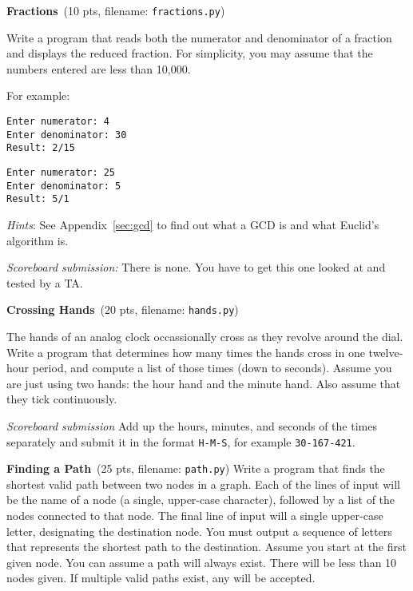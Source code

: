 \documentclass[11pt]{cselabheader}
\newcommand{\cop}[3]{\textbf{#1}~(#2 pts, filename: \texttt{#3})\quad}
\theoremstyle{plain}
\begin{document}
\begin{enumerate}
	\item \cop{Fractions}{10}{fractions.py}
		
		Write a program that reads both the numerator and denominator of
		a fraction and displays the reduced fraction. For simplicity, you
		may assume that the numbers entered are less than 10,000. 
		
		For example:
		\begin{lstlisting}[style=bash]
Enter numerator: 4
Enter denominator: 30
Result: 2/15
		\end{lstlisting}

		\begin{lstlisting}[style=bash]
Enter numerator: 25
Enter denominator: 5
Result: 5/1
		\end{lstlisting}

		\textit{Hints}: See Appendix~\ref{sec:gcd} to find out what a GCD is 
		and what Euclid's algorithm is. 

		\textit{Scoreboard submission:} There is none. You have to get this one
		looked at and tested by a TA.

        \item \cop{Crossing Hands}{20}{hands.py}

		The hands of an analog clock occassionally cross as they revolve around
		the dial. Write a program that determines how many times the hands
		cross in one twelve-hour period, and compute a list of those times
		(down to seconds). Assume you are just using two hands: the hour hand 
		and the minute hand. Also assume that they tick continuously.

		\textit{Scoreboard submission} Add up the hours, minutes, and seconds
		of the times separately and submit it in the format \texttt{H-M-S}, 
		for example \texttt{30-167-421}.

        \item \cop{Finding a Path}{25}{path.py}
          Write a program that finds the shortest valid path between two nodes in a graph.
          Each of the lines of input will be the name of a node (a single, upper-case
          character), followed by a list of the nodes connected to that node. The final
          line of input will a single upper-case letter, designating the destination node.
          You must output a sequence of letters that represents the shortest path to the
          destination. Assume you start at the first given node. You can assume a path will
          always exist. There will be less than 10 nodes given. If multiple valid paths
          exist, any will be accepted.
          

\end{enumerate}
\end{document}
